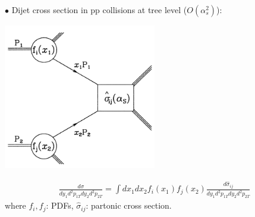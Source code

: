 \documentclass[9pt,a4paper,unknownkeysallowed,xcolor=dvipsnames,aspectratio=43]{beamer}
\begin{document}
%
%
\begin{frame}
\vspace{2mm}

{\color{darkred}\Large$\bullet$} Dijet cross section in pp collisions at tree level ($O(\alpha_s^2)$):
\begin{center}
\includegraphics[width=0.5\textwidth]{02/dijetTree.png}
\end{center}
\begin{align}
    \frac{d\sigma}{dy_1 d^2p_{1T} dy_2 d^2p_{2T}} = \int dx_1 dx_2 f_i(x_1)f_j(x_2)\frac{d\hat{\sigma}_{ij}}{dy_1 d^2p_{1T} dy_2 d^2p_{2T}}
\end{align}
where $f_i, f_j$: PDFs, $\hat{\sigma}_{ij}$: partonic cross section.
\end{frame}
%
%
\end{document}
